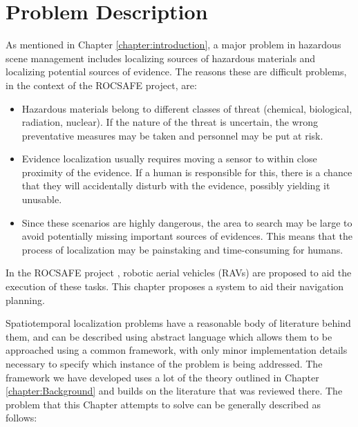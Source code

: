 \section{Problem Description}\label{sec:TLocalisationProbDescription}
As mentioned in Chapter \ref{chapter:introduction}, a major problem in hazardous scene management includes localizing sources of hazardous materials and localizing potential sources of evidence. The reasons these are difficult problems, in the context of the ROCSAFE project, are:
\begin{itemize}
    \item Hazardous materials belong to different classes of threat (chemical, biological, radiation, nuclear). If the nature of the threat is uncertain, the wrong preventative measures may be taken and personnel may be put at risk. 
    \item Evidence localization usually requires moving a sensor to within close proximity of the evidence. If a human is responsible for this, there is a chance that they will accidentally disturb with the evidence, possibly yielding it unusable.
    \item Since these scenarios are highly dangerous, the area to search may be large to avoid potentially missing important sources of evidences. This means that the process of localization may be painstaking and time-consuming for humans.
\end{itemize}
In the ROCSAFE project \cite{Bagherzadeh2017ROCSAFE:Incidents}, robotic aerial vehicles (RAVs) are proposed to aid the execution of these tasks. This chapter proposes a system to aid their navigation planning.

  



Spatiotemporal localization problems have a reasonable body of literature behind them, and can be described using abstract language which allows them to be approached using a common framework, with only minor implementation details necessary to specify which instance of the problem is being addressed. The framework we have developed uses a lot of the theory outlined in Chapter \ref{chapter:Background} and builds on the literature that was reviewed there. The problem that this Chapter attempts to solve can be generally described as follows: \par

